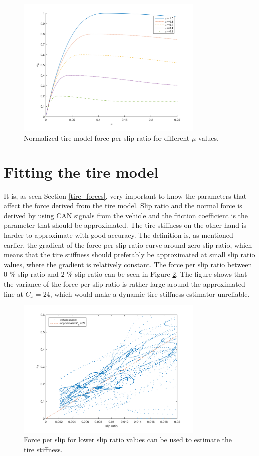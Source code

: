 \begin{figure}[h]
	\centering
	\includegraphics[width=0.8\textwidth]{Pictures/slipkraft_olika_mue}
	\caption {Normalized tire model force per slip ratio for different $ \mu $ values.}
	\label{different_mue}
\end{figure}

\section{Fitting the tire model}
It is, as seen Section \ref{tire_forces}, very important to know the parameters that affect the force derived from the tire model. Slip ratio and the normal force is derived by using CAN signals from the vehicle and the friction coefficient is the parameter that should be approximated. The tire stiffness on the other hand is harder to approximate with good accuracy. The definition is, as mentioned earlier, the gradient of the force per slip ratio curve around zero slip ratio, which means that the tire stiffness should preferably be approximated at small slip ratio values, where the gradient is relatively constant. The force per slip ratio between $ 0 $ \% slip ratio and $ 2 $ \% slip ratio can be seen in Figure \ref{slip_kraft_sma_slip}. The figure shows that the variance of the force per slip ratio is rather large around the approximated line at $ C_{x} = 24 $, which would make a dynamic tire stiffness estimator unreliable.

\begin{figure}[h]
	\centering
	\includegraphics[width=0.8\textwidth]{Pictures/slip_kraft_sma_slip}
	\caption {Force per slip for lower slip ratio values can be used to estimate the tire stiffness.}
	\label{slip_kraft_sma_slip}
\end{figure}

